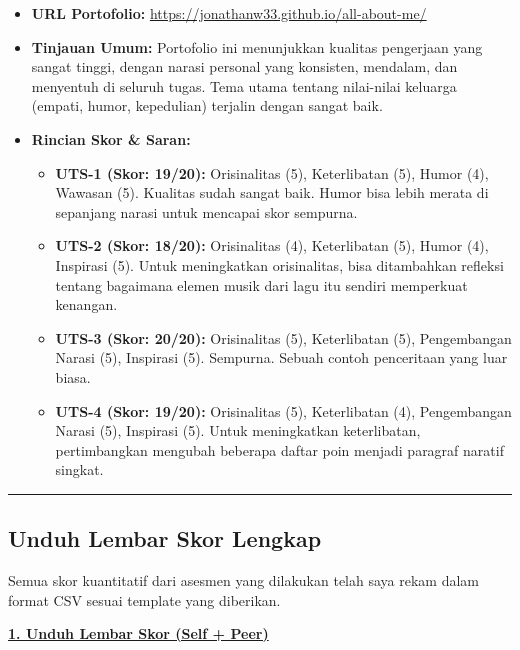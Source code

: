 \documentclass[
  letterpaper,
  DIV=11,
  numbers=noendperiod]{scrreprt}
\providecommand{\tightlist}{%
  \setlength{\itemsep}{0pt}\setlength{\parskip}{0pt}}
\begin{document}
\begin{itemize}
\tightlist
\item
  \textbf{URL Portofolio:}
  \url{https://jonathanw33.github.io/all-about-me/}
\item
  \textbf{Tinjauan Umum:} Portofolio ini menunjukkan kualitas pengerjaan
  yang sangat tinggi, dengan narasi personal yang konsisten, mendalam,
  dan menyentuh di seluruh tugas. Tema utama tentang nilai-nilai
  keluarga (empati, humor, kepedulian) terjalin dengan sangat baik.
\item
  \textbf{Rincian Skor \& Saran:}

  \begin{itemize}
  \tightlist
  \item
    \textbf{UTS-1 (Skor: 19/20):} Orisinalitas (5), Keterlibatan (5),
    Humor (4), Wawasan (5). Kualitas sudah sangat baik. Humor bisa lebih
    merata di sepanjang narasi untuk mencapai skor sempurna.
  \item
    \textbf{UTS-2 (Skor: 18/20):} Orisinalitas (4), Keterlibatan (5),
    Humor (4), Inspirasi (5). Untuk meningkatkan orisinalitas, bisa
    ditambahkan refleksi tentang bagaimana elemen musik dari lagu itu
    sendiri memperkuat kenangan.
  \item
    \textbf{UTS-3 (Skor: 20/20):} Orisinalitas (5), Keterlibatan (5),
    Pengembangan Narasi (5), Inspirasi (5). Sempurna. Sebuah contoh
    penceritaan yang luar biasa.
  \item
    \textbf{UTS-4 (Skor: 19/20):} Orisinalitas (5), Keterlibatan (4),
    Pengembangan Narasi (5), Inspirasi (5). Untuk meningkatkan
    keterlibatan, pertimbangkan mengubah beberapa daftar poin menjadi
    paragraf naratif singkat.
  \end{itemize}
\end{itemize}

\begin{center}\rule{0.5\linewidth}{0.5pt}\end{center}

\subsection{Unduh Lembar Skor Lengkap}\label{unduh-lembar-skor-lengkap}

Semua skor kuantitatif dari asesmen yang dilakukan telah saya rekam
dalam format CSV sesuai template yang diberikan.

\href{./UTS-5_Skor.csv}{\textbf{1. Unduh Lembar Skor (Self + Peer)}}
\end{document}

